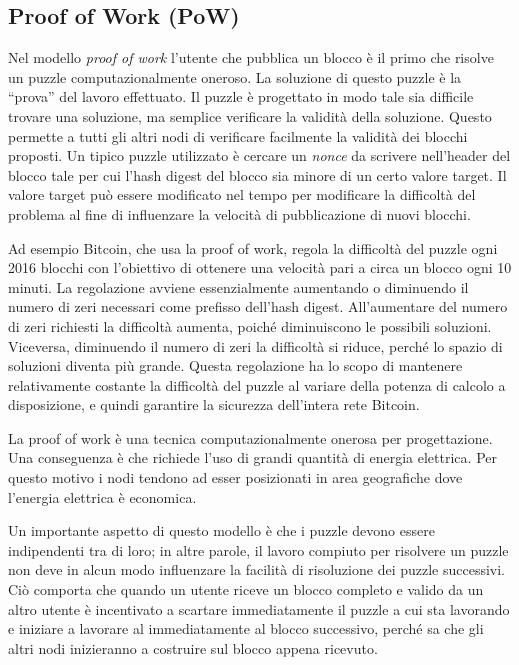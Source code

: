 \subsection{Proof of Work (PoW)}
Nel modello \textit{proof of work} l'utente che pubblica un blocco è il primo che risolve
un puzzle computazionalmente oneroso. La soluzione di questo puzzle è la ``prova'' del lavoro effettuato.
Il puzzle è progettato in modo tale sia difficile trovare una soluzione, ma semplice verificare la
validità della soluzione.
Questo permette a tutti gli altri nodi di verificare facilmente la validità dei blocchi proposti.
Un tipico puzzle utilizzato è cercare un \textit{nonce} da scrivere nell'header del blocco
tale per cui l'hash digest del blocco sia minore di un certo valore target.
Il valore target può essere modificato nel tempo per modificare la difficoltà del problema al fine di
influenzare la velocità di pubblicazione di nuovi blocchi.

Ad esempio Bitcoin, che usa la proof of work, regola la difficoltà del puzzle ogni 2016 blocchi
con l'obiettivo di ottenere una velocità pari a circa un blocco ogni 10 minuti. La regolazione
avviene essenzialmente aumentando o diminuendo il numero di zeri necessari come prefisso dell'hash digest.
All'aumentare del numero di zeri richiesti la difficoltà aumenta, poiché diminuiscono le possibili soluzioni.
Viceversa, diminuendo il numero di zeri la difficoltà si riduce, perché lo spazio di soluzioni diventa più grande.
Questa regolazione ha lo scopo di mantenere relativamente costante la difficoltà del puzzle al variare della
potenza di calcolo a disposizione, e quindi garantire la sicurezza dell'intera rete Bitcoin.

La proof of work è una tecnica computazionalmente onerosa per progettazione. Una conseguenza è che richiede
l'uso di grandi quantità di energia elettrica. Per questo motivo
i nodi tendono ad esser posizionati
in area geografiche dove l'energia elettrica è economica.

Un importante aspetto di questo modello è che i puzzle devono essere indipendenti tra di loro; in
altre parole, il lavoro compiuto per risolvere un puzzle non deve in alcun modo influenzare la facilità di
risoluzione dei puzzle successivi. Ciò comporta che quando un utente riceve un blocco completo
e valido da un altro utente è incentivato a scartare immediatamente il puzzle a cui sta lavorando e
iniziare a lavorare al immediatamente al blocco successivo, perché sa che gli altri nodi
inizieranno a costruire sul blocco appena ricevuto.


